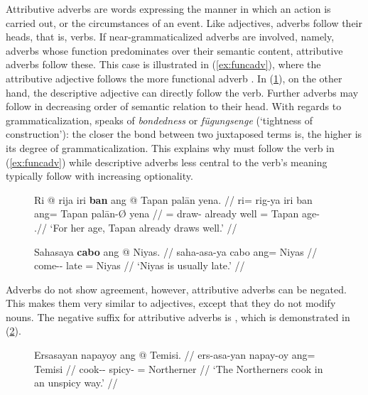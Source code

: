 Attributive adverbs are words expressing the manner in which an action is
carried out, or the circumstances of an event. Like adjectives, adverbs follow
their heads, that is, verbs. If near-grammaticalized adverbs are involved,
namely, adverbs whose function predominates over their semantic content,
attributive adverbs follow these. This case is illustrated in
(\ref{ex:funcadv}), where the attributive adjective 
follows the more functional adverb . In
(\ref{ex:attradv}), on the other hand, the descriptive adjective
 can directly follow the verb. Further adverbs may
follow in decreasing order of semantic relation to their head. With regards to
grammaticalization, \citet[157\psqq]{lehmann2015} speaks of \emph{bondedness}
or \emph{fügungsenge} (`tightness of construction'): the closer the bond
between two juxtaposed terms is, the higher is its degree of
grammaticalization. This explains why  must follow the verb in
(\ref{ex:funcadv}) while descriptive adverbs less central to the verb's meaning
typically follow with increasing optionality.

\begin{figure}[h]
\pex
\a\label{ex:funcadv}\begingl
	\gla Ri @ rija iri \textbf{ban} ang @ Tapan palān yena. //
	\glb ri= rig-ya iri ban ang= Tapan palān-Ø yena //
	\glc \InsT{}= draw-\TsgM{} already well \Aarg{}= Tapan age-\Top{} 
		\TsgF{}.\Gen //
	\glft `For her age, Tapan already draws well.' //
\endgl

\a\label{ex:attradv}\begingl
	\gla Sahasaya \textbf{cabo} ang @ Niyas. //
	\glb saha-asa-ya cabo ang= Niyas //
	\glc come-\Hab{}-\TsgM{} late \Aarg{}= Niyas //
	\glft `Niyas is usually late.' //
\endgl
\xe
\end{figure}

Adverbs do not show agreement, however, attributive adverbs can be negated.
This makes them very similar to adjectives, except that they do not modify
nouns. The negative suffix for attributive adverbs is , which is
demonstrated in (\ref{ex:advneg}).

\begin{figure}[h]
\ex\label{ex:advneg}\begingl
	\gla Ersasayan napayoy ang @ Temisi. //
	\glb ers-asa-yan napay-oy ang= Temisi //
	\glc cook-\Hab{}-\TplM{} spicy-\Neg{} \Aarg{}= Northerner //
	\glft `The Northerners cook in an unspicy way.' //
\endgl\xe
\end{figure}

